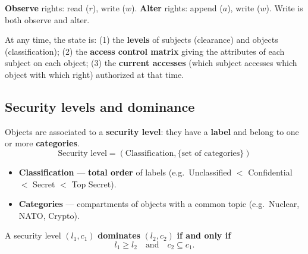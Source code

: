\begin{rembox}[title=Observe vs.\ alter]
\textbf{Observe} rights: read ($r$), write ($w$). \textbf{Alter} rights: append ($a$),
write ($w$). Write is both observe and alter.
\end{rembox}

\begin{defnbox}[title=State of a BLP system]
At any time, the state is: (1) the \textbf{levels} of subjects (clearance) and objects
(classification); (2) the \textbf{access control matrix} giving the attributes of each subject on
each object; (3) the \textbf{current accesses} (which subject accesses which object with which
right) authorized at that time.
\end{defnbox}

\subsection{Security levels and dominance}

\begin{defnbox}[title=Security level (classification of objects)]
Objects are associated to a \textbf{security level}: they have a \textbf{label} and
belong to one or more \textbf{categories}.
\[
  \text{Security level} = (\text{Classification}, \{\text{set of categories}\})
\]
\begin{itemize}
  \item \textbf{Classification} --- \textbf{total order} of labels (e.g.\
        Unclassified $<$ Confidential $<$ Secret $<$ Top Secret).
  \item \textbf{Categories} --- compartments of objects with a common topic (e.g.\
        Nuclear, NATO, Crypto).
\end{itemize}
\end{defnbox}

\begin{defnbox}[title=Dominance relationship]
A security level $(l_1, c_1)$ \textbf{dominates} $(l_2, c_2)$ \textbf{if and only if}
\[
  l_1 \geq l_2 \quad\text{and}\quad c_2 \subseteq c_1 .
\]
\end{defnbox}

